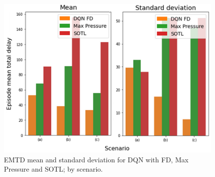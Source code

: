 \documentclass[journal]{IEEEtran}
\begin{document}
\begin{figure}[htbp]
  \begin{center}
    \includegraphics[width=0.9\linewidth,keepaspectratio]{img/results/fd_2.png}  
    \caption{EMTD mean and standard deviation for DQN with FD, Max Pressure and SOTL; by scenario.}
    \label{fig:fd_2}
  \end{center}
\end{figure}
\end{document}
